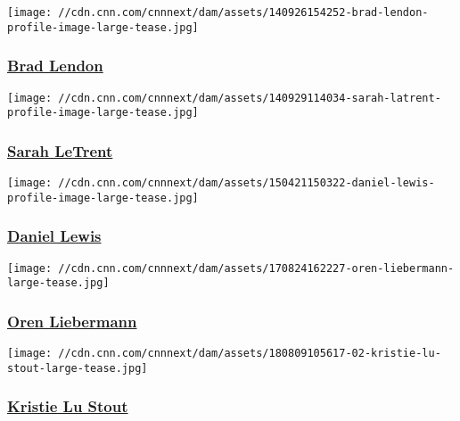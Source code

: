 \href{/profiles/brad-lendon}{}

\texttt{[image: //cdn.cnn.com/cnnnext/dam/assets/140926154252-brad-lendon-profile-image-large-tease.jpg]}

\hypertarget{brad-lendon}{%
\subsubsection{\texorpdfstring{\href{/profiles/brad-lendon}{Brad
Lendon}}{Brad Lendon}}\label{brad-lendon}}

\href{/profiles/sarah-letrent}{}

\texttt{[image: //cdn.cnn.com/cnnnext/dam/assets/140929114034-sarah-latrent-profile-image-large-tease.jpg]}

\hypertarget{sarah-letrent}{%
\subsubsection{\texorpdfstring{\href{/profiles/sarah-letrent}{Sarah
LeTrent}}{Sarah LeTrent}}\label{sarah-letrent}}

\href{/profiles/daniel-lewis-profile}{}

\texttt{[image: //cdn.cnn.com/cnnnext/dam/assets/150421150322-daniel-lewis-profile-image-large-tease.jpg]}

\hypertarget{daniel-lewis}{%
\subsubsection{\texorpdfstring{\href{/profiles/daniel-lewis-profile}{Daniel
Lewis}}{Daniel Lewis}}\label{daniel-lewis}}

\href{/profiles/oren-liebermann}{}

\texttt{[image: //cdn.cnn.com/cnnnext/dam/assets/170824162227-oren-liebermann-large-tease.jpg]}

\hypertarget{oren-liebermann}{%
\subsubsection{\texorpdfstring{\href{/profiles/oren-liebermann}{Oren
Liebermann}}{Oren Liebermann}}\label{oren-liebermann}}

\href{/profiles/kristie-lu-stout}{}

\texttt{[image: //cdn.cnn.com/cnnnext/dam/assets/180809105617-02-kristie-lu-stout-large-tease.jpg]}

\hypertarget{kristie-lu-stout}{%
\subsubsection{\texorpdfstring{\href{/profiles/kristie-lu-stout}{Kristie
Lu Stout}}{Kristie Lu Stout}}\label{kristie-lu-stout}}

